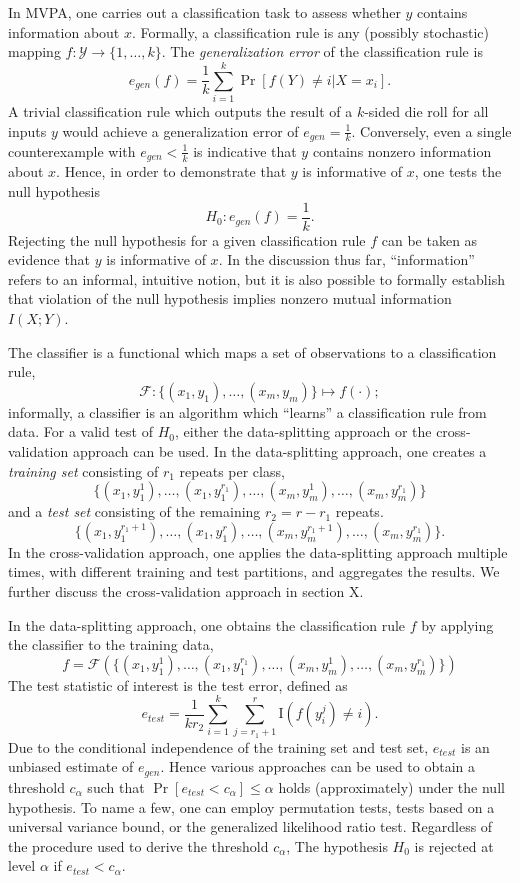 \documentclass[12pt]{article}
\begin{document}
In MVPA, one carries out a classification task to assess whether $y$ contains information about $x$.
Formally, a classification rule is any (possibly stochastic) mapping $f: \mathcal{Y} \to \{1,\hdots, k\}$.
The \emph{generalization error} of the classification rule is
\[
e_{gen}(f) = \frac{1}{k} \sum_{i=1}^k\Pr[f(Y) \neq i | X = x_i].
\]
A trivial classification rule which outputs the result of a $k$-sided die roll for all inputs $y$ would achieve a generalization error of $e_{gen} = \frac{1}{k}$.
Conversely, even a single counterexample with $e_{gen} < \frac{1}{k}$ is indicative that $y$ contains nonzero information about $x$.
Hence, in order to demonstrate that $y$ is informative of $x$, one tests the null hypothesis
\[
H_0: e_{gen}(f) = \frac{1}{k}.
\]
Rejecting the null hypothesis for a given classification rule $f$ can be taken as evidence that $y$ is informative of $x$.
In the discussion thus far, ``information'' refers to an informal, intuitive notion, but it is also possible to formally establish
that violation of the null hypothesis implies nonzero mutual information $I(X; Y)$.



The classifier is a functional which maps a set of observations to a classification rule,
\[
\mathcal{F}: \{(x_1,y_1),\hdots, (x_m, y_m)\} \mapsto f(\cdot);
\]
informally, a classifier is an algorithm which ``learns'' a classification rule from data.
For a valid test of $H_0$, 
either the data-splitting approach or the cross-validation approach can be used.
In the data-splitting approach, one creates a \emph{training set} consisting of $r_1$ repeats per class,
\[
\{(x_1, y_1^1),\hdots, (x_1,y_1^{r_1}), \hdots, (x_m, y_m^1),\hdots, (x_m,y_m^{r_1})\}
\]
and a \emph{test set} consisting of the remaining $r_2 = r - r_1$ repeats.
\[
\{(x_1, y_1^{r_1 + 1}),\hdots, (x_1,y_1^{r}), \hdots, (x_m, y_m^{r_1 + 1}),\hdots, (x_m,y_m^{r_1})\}.
\]
In the cross-validation approach, one applies the data-splitting approach multiple times, with different training and test partitions, and aggregates the results.
We further discuss the cross-validation approach in section X.

In the data-splitting approach, one obtains the classification rule $f$ by applying the classifier to the training data,
\[
f = \mathcal{F}(\{(x_1, y_1^1),\hdots, (x_1,y_1^{r_1}), \hdots, (x_m, y_m^1),\hdots, (x_m,y_m^{r_1})\})
\]
The test statistic of interest is the test error,
defined as
\[
e_{test} = \frac{1}{k r_2} \sum_{i=1}^k \sum_{j = r_1 + 1}^r \text{I}(f(y_i^j) \neq i).
\]
Due to the conditional independence of the training set and test set, $e_{test}$ is an unbiased estimate of $e_{gen}$.
Hence various approaches can be used to obtain a threshold $c_\alpha$
such that $\Pr[e_{test} < c_\alpha] \leq \alpha$ holds (approximately) under the null hypothesis.
To name a few, one can employ permutation tests, tests based on a universal variance bound, or the generalized likelihood ratio test.
Regardless of the procedure used to derive the threshold $c_\alpha$, The hypothesis $H_0$ is rejected at level $\alpha$ if $e_{test} < c_\alpha$.
\end{document}
